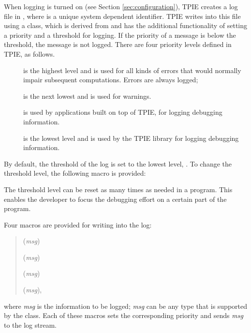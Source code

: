 When logging is turned on (see Section \ref{sec:configuration}), TPIE
creates a log file in , where
 is a unique system dependent identifier. TPIE writes into
this file using a  class, which is derived from
 and has the additional functionality of setting a priority
and a threshold for logging. If the priority of a message is below
 the threshold, the message is not logged. There are four priority
levels defined in TPIE, as follows.
\begin{description}
\item[] is the highest level and is used for all kinds
of errors that would normally impair subsequent computations. Errors are
always logged;
\item[] is the next lowest and is used for warnings.
\item[] is used by applications built on top of TPIE, for logging debugging information.
\item[] is the lowest level and is used by the TPIE library for logging debugging information.
\end{description}
By default, the threshold of the log is set to the lowest level, . To change the threshold level, the following macro is provided:
\begin{quote}
\myverb{)}
\end{quote}
The threshold level can be reset as many times as needed in a program. This enables the developer to focus the debugging effort on a certain part of the program.

Four macros are provided for writing into the log:
\begin{quote}
({\em msg})

({\em msg})

({\em msg})

({\em msg}),
\end{quote}
where {\em msg} is the information to be logged; {\em msg} can be any type
that is supported by the   class. Each of these
macros sets the corresponding priority and sends {\em msg} to the log
stream.



